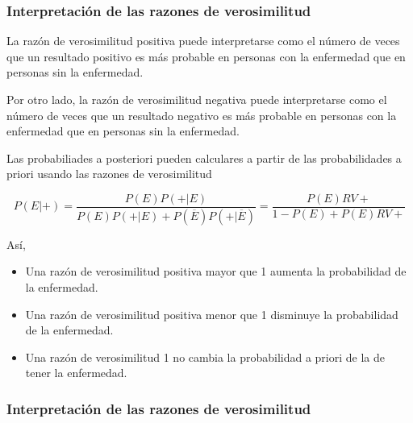 	
\begin{frame}
\frametitle{Interpretación de las razones de verosimilitud}
La razón de verosimilitud positiva puede interpretarse como el número de veces que un resultado positivo es más probable en personas con la enfermedad que en personas sin la enfermedad.
	
Por otro lado, la razón de verosimilitud negativa puede interpretarse como el número de veces que un resultado negativo es más probable en personas con la enfermedad que en personas sin la enfermedad.
	
Las probabiliades a posteriori pueden calculares a partir de las probabilidades a priori usando las razones de verosimilitud
	
\[
	P(E|+) = \frac{P(E)P(+|E)}{P(E)P(+|E)+P(\overline{E})P(+|\overline{E})} = \frac{P(E)RV+}{1-P(E)+P(E)RV+}
\]
	
Así,
\begin{itemize}
	\item Una razón de verosimilitud positiva mayor que 1 aumenta la probabilidad de la enfermedad.
	\item Una razón de verosimilitud positiva menor que 1 disminuye la probabilidad de la enfermedad.
	\item Una razón de verosimilitud 1 no cambia la probabilidad a priori de la de tener la enfermedad.
\end{itemize}
\end{frame}
	
	
\begin{frame}
\frametitle{Interpretación de las razones de verosimilitud}
\begin{center}
\end{center}
\end{frame}